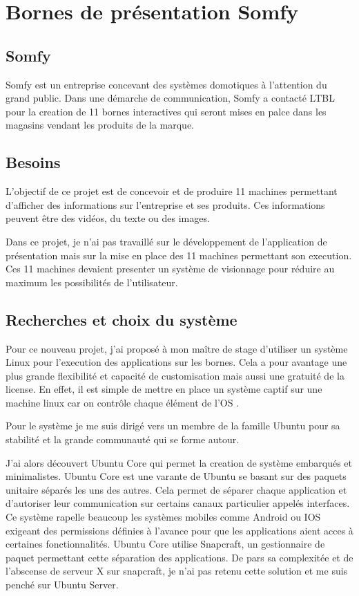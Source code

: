\section{Bornes de présentation Somfy}

\subsection{Somfy}

Somfy est un entreprise concevant des systèmes domotiques à l'attention du grand public.
Dans une démarche de communication, Somfy a contacté LTBL pour la creation de 11 bornes interactives qui seront mises en palce dans les magasins vendant les produits de la marque.

\subsection{Besoins}

L'objectif de ce projet est de concevoir et de produire 11 machines permettant d'afficher des informations sur l'entreprise et ses produits.
Ces informations peuvent être des vidéos, du texte ou des images.

Dans ce projet, je n'ai pas travaillé sur le développement de l'application de présentation mais sur la mise en place des 11 machines permettant son execution.
Ces 11 machines devaient presenter un système de visionnage pour réduire au maximum les possibilités de l'utilisateur.

\subsection{Recherches et choix du système}

Pour ce nouveau projet, j'ai proposé à mon maître de stage d'utiliser un système Linux pour l'execution des applications sur les bornes.
Cela a pour avantage une plus grande flexibilité et capacité de customisation mais aussi une gratuité de la license.
En effet, il est simple de mettre en place un système captif sur une machine linux car on contrôle chaque élément de l'OS .

Pour le système je me suis dirigé vers un membre de la famille Ubuntu pour sa stabilité et la grande communauté qui se forme autour.

J'ai alors découvert Ubuntu Core qui permet la creation de système embarqués et minimalistes.
Ubuntu Core est une varante de Ubuntu se basant sur des paquets unitaire séparés les uns des autres.
Cela permet de séparer chaque application et d'autoriser leur communication sur certains canaux particulier appelés interfaces.
Ce système rapelle beaucoup les systèmes mobiles comme Android ou IOS exigeant des permissions définies à l'avance pour que les applications aient acces à certaines fonctionnalités.
Ubuntu Core utilise Snapcraft, un gestionnaire de paquet permettant cette séparation des applications.
De pars sa complexitée et de l'abscense de serveur X sur snapcraft, je n'ai pas retenu cette solution et me suis penché sur Ubuntu Server.

